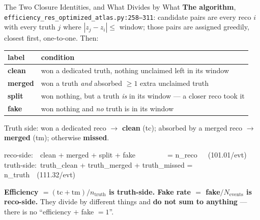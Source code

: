 \documentclass[xcolor=table,aspectratio=169]{beamer}
\begin{document}
\begin{frame}[shrink=15]{The Two Closure Identities, and What Divides by What}
    \small
    \textbf{The algorithm}, \texttt{efficiency\_res\_optimized\_atlas.py:258--311}:
    candidate pairs are every reco $i$ with every truth $j$ where
    $|z_j - z_i| \leq$ window; those pairs are assigned greedily, closest first,
    one-to-one. Then:

    \vspace{0.3em}
    \begin{center}\footnotesize
    \begin{tabular}{ll}
        \hline
        \textbf{label} & \textbf{condition} \\
        \hline
        \textcolor{mygreen!70!black}{\textbf{clean}}  & won a dedicated truth, nothing unclaimed left in its window \\
        \textcolor{myorange!85!black}{\textbf{merged}} & won a truth \emph{and} absorbed $\geq 1$ extra unclaimed truth \\
        \textcolor{myblue}{\textbf{split}}   & won nothing, but a truth \emph{is} in its window --- a closer reco took it \\
        \textcolor{myred}{\textbf{fake}}    & won nothing and \emph{no} truth is in its window \\
        \hline
    \end{tabular}
    \end{center}
    \vspace{0.2em}

    Truth side: won a dedicated reco $\to$ \textbf{clean} (tc); absorbed by a merged
    reco $\to$ \textbf{merged} (tm); otherwise \textbf{missed}.

    \vspace{0.4em}
    \begin{center}
    \colorbox{black!5}{\parbox{0.93\linewidth}{\footnotesize\ttfamily
    reco-side:\ \ clean + merged + split + fake\ \ \ \ \ \ \ \ \ = n\_reco\ \ \ (101.01/evt)\\
    truth-side:\ truth\_clean + truth\_merged + truth\_missed = n\_truth\ \ (111.32/evt)}}
    \end{center}
    \vspace{0.3em}

    \textcolor{pennred}{\textbf{Efficiency $=(\text{tc}+\text{tm})/n_\text{truth}$ is
    truth-side. Fake rate $=$ fake$/N_\text{events}$ is reco-side.}} They divide by
    different things and \textbf{do not sum to anything} --- there is no
    ``efficiency $+$ fake $= 1$''.
\end{frame}
\end{document}
